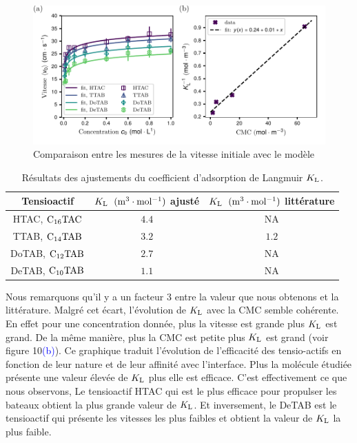 \documentclass[french, 10pt]{article}
\begin{document}
\begin{figure}[!ht]
  \centering
  \includegraphics[scale=1]{Vitesse_initiale_versus_concentration_modele.pdf}
  \caption{Comparaison entre les mesures de la vitesse initiale avec le modèle}
  \label{fig:modelev0}
\end{figure}

\begin{table}[ht!]
  \centering
  \begin{tabular}{ccc}
  \hline \hline
  Tensioactif & $K_{\rm L}$ $\rm(m^{3}\cdot mol^{-1})$ ajusté & $K_{\rm L}$ $\rm(m^{3}\cdot mol^{-1})$ littérature \\ \hline \hline
  HTAC, $\rm C_{16}TAC$ & $4.4$ & NA \\
  TTAB, $\rm C_{14}TAB$ & $3.2$ & $1.2$ \\
  DoTAB, $\rm C_{12}TAB$ & $2.7$ & NA \\
  DeTAB, $\rm C_{10}TAB$ & $1.1$ & NA \\ \hline \hline
  \end{tabular}
  \caption{Résultats des ajustements du coefficient d'adsorption de Langmuir $K_{\rm L}$.}
  \label{TABLE:resAjustement}
\end{table}

Nous remarquons qu'il y a un facteur $3$ entre la valeur que nous obtenons et la littérature. Malgré cet écart, l'évolution de $K_{\rm L}$ avec la CMC semble cohérente. En effet pour une concentration donnée, plus la vitesse est grande plus $K_{\rm L}$ est grand. De la même manière, plus la CMC est petite plus $K_{\rm L}$ est grand (voir figure 10\textcolor{blue}{(b)}). Ce graphique traduit l'évolution de l'efficacité des tensio-actifs en fonction de leur nature et de leur affinité avec l'interface. Plus la molécule étudiée présente une valeur élevée de $K_{\rm L}$ plus elle est efficace. C'est effectivement ce que nous observons, Le tensioactif HTAC qui est le plus efficace pour propulser les bateaux obtient la plus grande valeur de $K_{\rm L}$. Et inversement, le DeTAB est le tensioactif qui présente les vitesses les plus faibles et obtient la valeur de $K_{\rm L}$ la plus faible.\bigskip
\end{document}
